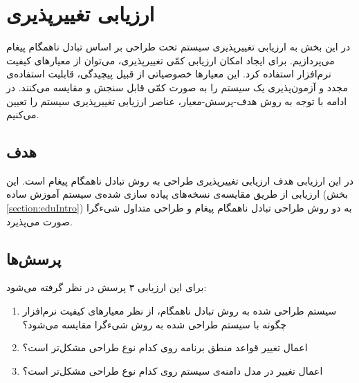 \section{ارزیابی تغییرپذیری}
در این بخش به ارزیابی تغییرپذیری سیستم تحت طراحی بر اساس تبادل ناهمگام پیغام می‌پردازیم. برای ایجاد امکان ارزیابی کمّی تغییرپذیری، می‌توان از معیارهای کیفیت نرم‌افزار استفاده کرد. این معیارها خصوصیاتی از قبیل پیچیدگی، قابلیت استفاده‌ی مجدد و آزمون‌پذیری یک سیستم را به صورت کمّی قابل سنجش و مقایسه می‌کنند. در ادامه با توجه به روش هدف-پرسش-معیار، عناصر ارزیابی تغییرپذیری سیستم را تعیین می‌کنیم.

\subsection{هدف}
در این ارزیابی هدف ارزیابی تغییرپذیری طراحی به روش تبادل ناهمگام پیغام است. این ارزیابی از طریق مقایسه‌ی نسخه‌های پیاده سازی شده‌ی سیستم آموزش ساده (بخش \ref{section:eduIntro}) به دو روش طراحی تبادل ناهمگام پیغام و طراحی متداول شیءگرا صورت می‌پذیرد.

\subsection{پرسش‌ها}
برای این ارزیابی ۳ پرسش در نظر گرفته می‌شود:
\begin{enumerate}
\item سیستم طراحی شده به روش تبادل ناهمگام، از نظر معیارهای کیفیت نرم‌افزار چگونه با سیستم طراحی شده به روش شیءگرا مقایسه می‌شود؟
\item اعمال تغییر قواعد منطق برنامه روی کدام نوع طراحی مشکل‌تر است؟ 
\item اعمال تغییر در مدل دامنه‌ی سیستم روی کدام نوع طراحی مشکل‌تر است؟ 
\end{enumerate}

